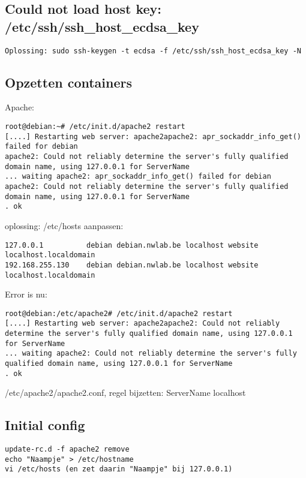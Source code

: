 \subsection{Could not load host key: /etc/ssh/ssh\_host\_ecdsa\_key}
\begin{lstlisting}
Oplossing: sudo ssh-keygen -t ecdsa -f /etc/ssh/ssh_host_ecdsa_key -N 
\end{lstlisting}

\subsection{Opzetten containers}
Apache:
\begin{lstlisting}
root@debian:~# /etc/init.d/apache2 restart
[....] Restarting web server: apache2apache2: apr_sockaddr_info_get() failed for debian
apache2: Could not reliably determine the server's fully qualified domain name, using 127.0.0.1 for ServerName
... waiting apache2: apr_sockaddr_info_get() failed for debian apache2: Could not reliably determine the server's fully qualified domain name, using 127.0.0.1 for ServerName
. ok 
\end{lstlisting}
    
oplossing: /etc/hosts aanpassen:
\begin{lstlisting}
127.0.0.1          debian debian.nwlab.be localhost website localhost.localdomain
192.168.255.130    debian debian.nwlab.be localhost website localhost.localdomain
\end{lstlisting}
   
Error is nu:
\begin{lstlisting}
root@debian:/etc/apache2# /etc/init.d/apache2 restart
[....] Restarting web server: apache2apache2: Could not reliably determine the server's fully qualified domain name, using 127.0.0.1 for ServerName
... waiting apache2: Could not reliably determine the server's fully qualified domain name, using 127.0.0.1 for ServerName
. ok 
\end{lstlisting}
    
/etc/apache2/apache2.conf, regel bijzetten: ServerName localhost

\subsection{Initial config}
\begin{lstlisting}
update-rc.d -f apache2 remove
echo "Naampje" > /etc/hostname
vi /etc/hosts (en zet daarin "Naampje" bij 127.0.0.1)
\end{lstlisting}
    
